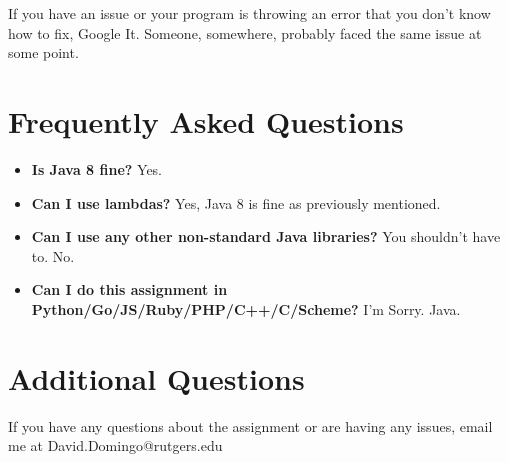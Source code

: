 \documentclass{article}
\begin{document}
\begin{info}
If you have an issue or your program is throwing an error that you don't know how to fix, Google It. Someone, somewhere, probably faced the same issue at some point.
\end{info}

\section*{Frequently Asked Questions}
\begin{itemize}
\item \textbf{Is Java 8 fine?} Yes.
\item \textbf{Can I use lambdas?} Yes, Java 8 is fine as previously mentioned.
\item \textbf{Can I use any other non-standard Java libraries?} You shouldn't have to. No.
\item \textbf{Can I do this assignment in Python/Go/JS/Ruby/PHP/C++/C/Scheme?} I'm Sorry. Java.
\end{itemize}

\section*{Additional Questions}
If you have any questions about the assignment or are having any issues, email me at David.Domingo@rutgers.edu
\end{document}
